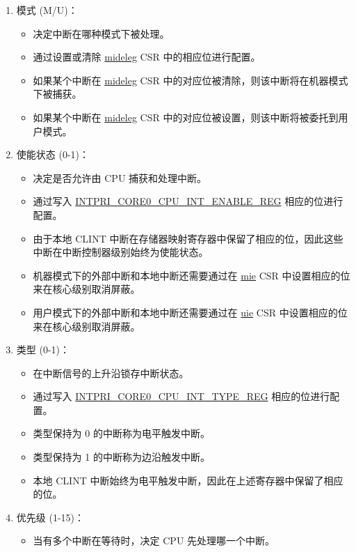 \documentclass[main\_\_CN.tex]{subfiles}
\begin{document}
\begin{enumerate}
    \item 模式 (M/U)：
    \begin{itemize}
        \item 决定中断在哪种模式下被处理。
        \item 通过设置或清除 \hyperref[regdesc:MIDELEG]{mideleg} CSR 中的相应位进行配置。
        \item 如果某个中断在 \hyperref[regdesc:MIDELEG]{mideleg} CSR 中的对应位被清除，则该中断将在机器模式下被捕获。
        \item 如果某个中断在 \hyperref[regdesc:MIDELEG]{mideleg} CSR 中的对应位被设置，则该中断将被委托到用户模式。
    \end{itemize}
    \item 使能状态 (0-1)：
    \begin{itemize}
        \item 决定是否允许由 CPU 捕获和处理中断。
        \item 通过写入 \hyperref[regdesc:INTPRICORE0CPUINTENABLEREG]{INTPRI\_CORE0\_CPU\_INT\_ENABLE\_REG} 相应的位进行配置。
        \item 由于本地 CLINT 中断在存储器映射寄存器中保留了相应的位，因此这些中断在中断控制器级别始终为使能状态。
        \item 机器模式下的外部中断和本地中断还需要通过在 \hyperref[regdesc:MIE]{mie} CSR 中设置相应的位来在核心级别取消屏蔽。
        \item 用户模式下的外部中断和本地中断还需要通过在 \hyperref[regdesc:UIE]{uie} CSR 中设置相应的位来在核心级别取消屏蔽。
    \end{itemize}
    \item 类型 (0-1)：
    \begin{itemize}
        \item 在中断信号的上升沿锁存中断状态。
        \item 通过写入 \hyperref[regdesc:INTPRICORE0CPUINTTYPEREG]{INTPRI\_CORE0\_CPU\_INT\_TYPE\_REG} 相应的位进行配置。
        \item 类型保持为 0 的中断称为电平触发中断。
        \item 类型保持为 1 的中断称为边沿触发中断。
        \item 本地 CLINT 中断始终为电平触发中断，因此在上述寄存器中保留了相应的位。
    \end{itemize}
    \item 优先级 (1-15)：
    \begin{itemize}
        \item 当有多个中断在等待时，决定 CPU 先处理哪一个中断。

\end{itemize}
\end{enumerate}
\end{document}
